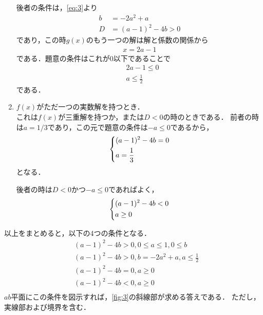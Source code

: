\documentclass[a4paper,10pt]{ltjsarticle}
\begin{document}
\begin{multicols}{2}
\begin{enumerate}
          後者の条件は，\cref{eq:3}より
          \begin{align*}
            b & = - 2a^2+a        \\
            D & = (a-1)^2 -4b > 0
          \end{align*}
          であり，この時$g(x)$のもう一つの解は解と係数の関係から
          \begin{align*}
            x = 2a - 1
          \end{align*}
          である．題意の条件はこれが$0$以下であることで
          \begin{align*}
             & 2a-1 \le 0        \\
             & a \le \frac{1}{2}
          \end{align*}
          である．
    \item  $f(x)$がただ一つの実数解を持つとき．\\
          これは$f(x)$が三重解を持つか，または$D<0$の時のときである．
          前者の時は$a=1/3$であり，この元で題意の条件は$-a \le 0$であるから，
          \begin{align*}
            \begin{dcases}
              (a-1)^2 -4b = 0 \\
              a = \frac{1}{3}
            \end{dcases}
          \end{align*}
          となる．

          後者の時は$D<0$かつ$-a \le 0$であればよく，
          \begin{align*}
            \begin{dcases}
              (a-1)^2 -4b < 0 \\
              a \ge 0
            \end{dcases}
          \end{align*}
  \end{enumerate}

  以上をまとめると，以下の4つの条件となる．
  \begin{align*}
     & (a-1)^2-4b > 0, 0 \le a \le 1, 0 \le b          \\
     & (a-1)^2 -4b > 0, b = - 2a^2+a, a\le \frac{1}{2} \\
     & (a-1)^2 -4b = 0, a \ge 0                        \\
     & (a-1)^2 -4b < 0 ,      a \ge 0                  \\
  \end{align*}
  $ab$平面にこの条件を図示すれば，\cref{fig:3}の斜線部が求める答えである．
  ただし，実線部および境界を含む．


\end{multicols}
\end{document}
